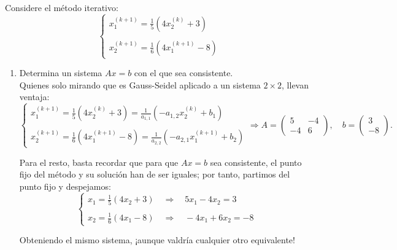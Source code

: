 \documentclass[12pt]{article}
\begin{document}
	\begin{ejercicio}[3 puntos]
		Considere el método iterativo: 
		$$\begin{cases}
			x^{(k+1)}_1 = \displaystyle \frac{1}{5} (4 x^{(k)}_2 + 3) \\
			\\
			x^{(k+1)}_2 = \displaystyle \frac{1}{6} (4 x^{(k+1)}_1 - 8)
		\end{cases}$$
		
		\begin{enumerate}[label=\alph*)]
			\item Determina un sistema $Ax = b$ con el que sea consistente. \\
				
				Quienes solo mirando que es Gauss-Seidel aplicado a un sistema $2 \times 2$, llevan ventaja:
				$$\begin{cases}
					x_1^{(k+1)} = \displaystyle \frac{1}{5} \left( 4 x_2^{(k)} + 3 \right) = \frac{1}{a_{1,1}} \left( -a_{1,2} x_2^{(k)} + b_1 \right) \\
					\\
					x_2^{(k+1)} = \displaystyle \frac{1}{6} \left( 4 x_1^{(k+1)} - 8 \right) = \frac{1}{a_{2,2}} \left( -a_{2,1} x_1^{(k+1)} + b_2 \right)
				\end{cases} \Rightarrow
				A = \begin{pmatrix} 5 & -4 \\ -4 & 6 \end{pmatrix}, \quad 
				b = \begin{pmatrix} 3 \\ -8 \end{pmatrix}.$$
				
				Para el resto, basta recordar que para que $Ax = b$ sea consistente, el punto fijo del método y su solución han de ser iguales; por tanto, partimos del punto fijo y despejamos:
				$$\begin{cases}
					x_1 = \displaystyle \frac{1}{5} \left( 4 x_2 + 3 \right) \quad \Rightarrow \quad 5 x_1 - 4 x_2 = 3 \\
					\\
					x_2 = \displaystyle \frac{1}{6} \left( 4 x_1 - 8 \right) \quad \Rightarrow \quad -4 x_1 + 6 x_2 = -8
				\end{cases}$$
				
				Obteniendo el mismo sistema, ¡aunque valdría cualquier otro equivalente!
				

\end{enumerate}
\end{ejercicio}
\end{document}
